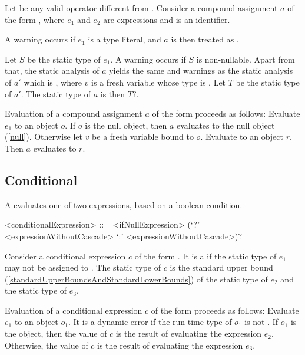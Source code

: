 \documentclass[makeidx]{article}
\begin{document}
\LMHash{}%
Let \op{} be any valid operator different from .
Consider a compound assignment $a$
of the form ,
where $e_1$ and $e_2$ are expressions and \id{} is an identifier.

\LMHash{}%
A warning occurs if $e_1$ is a type literal,
and $a$ is then treated as .

\LMHash{}%
Let $S$ be the static type of $e_1$.
A warning occurs if $S$ is non-nullable.
Apart from that,
the static analysis of $a$ yields
the same  and warnings as
the static analysis of $a'$ which is ,
where $v$ is a fresh variable whose type is .
Let $T$ be the static type of $a'$.
The static type of $a$ is then $T?$.

\LMHash{}%
Evaluation of a compound assignment $a$ of the form
proceeds as follows:
Evaluate $e_1$ to an object $o$.
If $o$ is the null object, then $a$ evaluates to the null object (\ref{null}).
Otherwise let $v$ be a fresh variable bound to $o$.
Evaluate  to an object $r$.
Then $a$ evaluates to $r$.
\EndCase


\subsection{Conditional}

\LMHash{}%
A  evaluates one of two expressions,
based on a boolean condition.

\begin{grammar}
<conditionalExpression> ::= <ifNullExpression>
  \gnewline{} (`?' <expressionWithoutCascade> `:' <expressionWithoutCascade>)?
\end{grammar}

\LMHash{}%
Consider a conditional expression $c$ of the form
.
It is a  if
the static type of $e_1$ may not be assigned to .
The static type of $c$ is the standard upper bound
(\ref{standardUpperBoundsAndStandardLowerBounds})
of the static type of $e_2$ and the static type of $e_3$.

\LMHash{}%
Evaluation of a conditional expression $c$ of the form
proceeds as follows:
Evaluate $e_1$ to an object $o_1$.
It is a dynamic error if the run-time type of $o_1$ is not .
If $o_1$ is the \TRUE{} object, then the value of $c$ is
the result of evaluating the expression $e_2$.
Otherwise, the value of $c$ is the result of evaluating the expression $e_3$.
\end{document}
